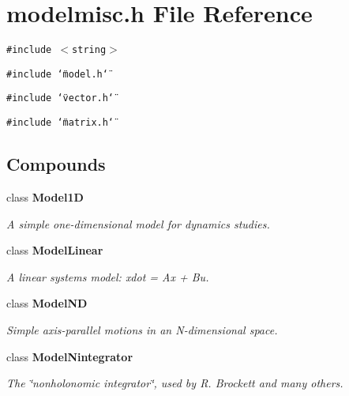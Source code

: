 \section{modelmisc.h File Reference}
\label{modelmisc_8h}
{\tt \#include $<$string$>$}\par
{\tt \#include \char`\"{}model.h\char`\"{}}\par
{\tt \#include \char`\"{}vector.h\char`\"{}}\par
{\tt \#include \char`\"{}matrix.h\char`\"{}}\par
\subsection*{Compounds}
\begin{CompactItemize}
\item 
class {\bf Model1D}
\begin{CompactList}\small\item\em A simple one-dimensional model for dynamics studies.\item\end{CompactList}\item 
class {\bf Model\-Linear}
\begin{CompactList}\small\item\em A linear systems model: xdot = Ax + Bu.\item\end{CompactList}\item 
class {\bf Model\-ND}
\begin{CompactList}\small\item\em Simple axis-parallel motions in an N-dimensional space.\item\end{CompactList}\item 
class {\bf Model\-Nintegrator}
\begin{CompactList}\small\item\em The \char`\"{}nonholonomic integrator\char`\"{}, used by R. Brockett and many others.\item\end{CompactList}\end{CompactItemize}
